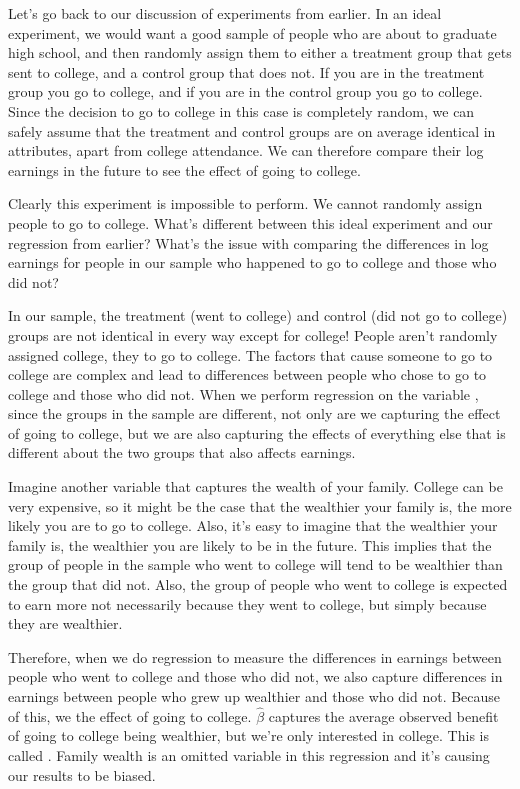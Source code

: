 \documentclass[letterpaper,10pt,english]{jupyterBook}
\begin{document}
\sphinxAtStartPar
Let’s go back to our discussion of experiments from earlier. In an ideal experiment, we would want a good sample of people who are about to graduate high school, and then randomly assign them to either a treatment group that gets sent to college, and a control group that does not. If you are in the treatment group you  go to college, and if you are in the control group you  go to college. Since the decision to go to college in this case is completely random, we can safely assume that the treatment and control groups are on average identical in attributes, apart from college attendance. We can therefore compare their log earnings in the future to see the effect of going to college.

\sphinxAtStartPar
Clearly this experiment is impossible to perform. We cannot randomly assign people to go to college. What’s different between this ideal experiment and our regression from earlier? What’s the issue with comparing the differences in log earnings for people in our sample who happened to go to college and those who did not?

\sphinxAtStartPar
In our sample, the treatment (went to college) and control (did not go to college) groups are not identical in every way except for college! People aren’t randomly assigned college, they  to go to college. The factors that cause someone to go to college are complex and lead to differences between people who chose to go to college and those who did not. When we perform regression on the variable , since the groups in the sample are different, not only are we capturing the effect of going to college, but we are also capturing the effects of everything else that is different about the two groups that also affects earnings.

\sphinxAtStartPar
Imagine another variable that captures the wealth of your family. College can be very expensive, so it might be the case that the wealthier your family is, the more likely you are to go to college. Also, it’s easy to imagine that the wealthier your family is, the wealthier you are likely to be in the future. This implies that the group of people in the sample who went to college will tend to be wealthier than the group that did not. Also, the group of people who went to college is expected to earn more not necessarily because they went to college, but simply because they are wealthier.

\sphinxAtStartPar
Therefore, when we do regression to measure the differences in earnings between people who went to college and those who did not, we also capture differences in earnings between people who grew up wealthier and those who did not. Because of this, we  the effect of going to college. \(\hat{\beta}\) captures the average observed benefit of going to college  being wealthier, but we’re only interested in college. This is called . Family wealth is an omitted variable in this regression and it’s causing our results to be biased.
\end{document}

